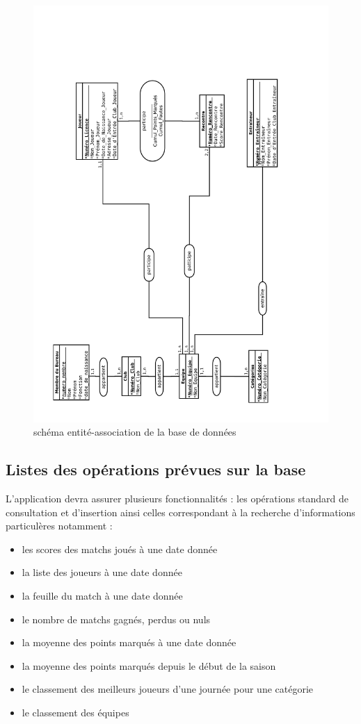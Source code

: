 \documentclass{article}
\begin{document}
\begin{figure}[h!]
\centering
\includegraphics[scale=0.35 , angle = -90]{BasketBall_EA.pdf}
\caption{schéma entité-association de la base de données}
\end{figure}

\subsection {Listes des opérations prévues sur la base}

L’application devra assurer plusieurs fonctionnalités : les opérations standard de consultation et d’insertion ainsi celles correspondant à la recherche d’informations particulères notamment : \\

\begin{itemize}
\item les scores des matchs joués à une date donnée
\item la liste des joueurs à une date donnée
\item la feuille du match à une date donnée
\item le nombre de matchs gagnés, perdus ou nuls
\item la moyenne des points marqués à une date donnée
\item la moyenne des points marqués depuis le début de la saison
\item le classement des meilleurs joueurs d’une journée pour une catégorie
\item le classement des équipes
\end{itemize}
\end{document}
